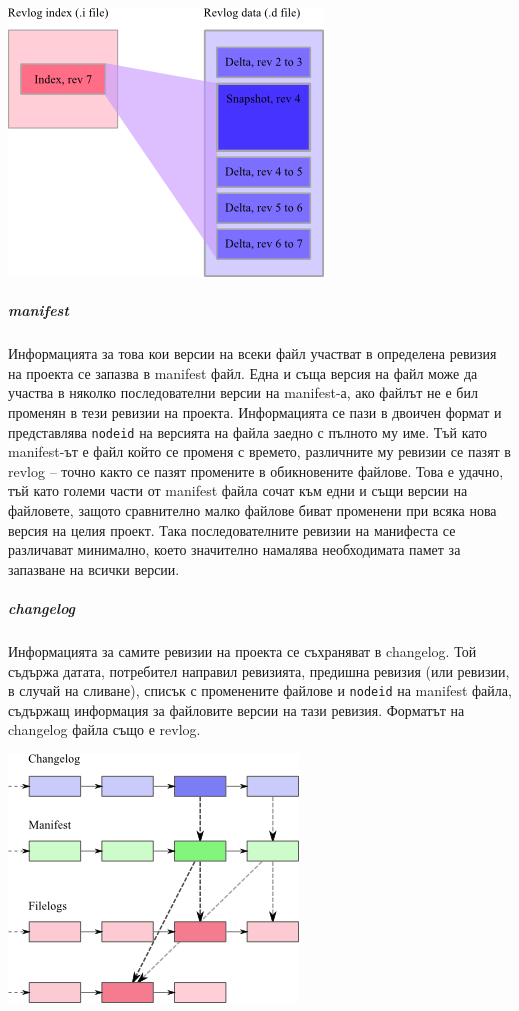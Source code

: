 \documentclass[a4paper]{article}
\begin{document}
    \begin{center}
      \includegraphics[scale=0.7]{hg_revlog}
    \end{center}

    \subparagraph{manifest} Информацията за това кои версии на всеки файл
    участват в определена ревизия на проекта се запазва в manifest файл.
    Една и съща версия на файл може да участва в няколко последователни версии
    на manifest-а, ако файлът не е бил променян в тези ревизии на проекта.
    Информацията се пази в двоичен формат и представлява \texttt{nodeid} на
    версията на файла заедно с пълното му име. Тъй като manifest-ът е файл
    който се променя с времето, различните му ревизии се пазят в revlog --
    точно както се пазят промените в обикновените файлове. Това е удачно, тъй
    като големи части от manifest файла сочат към едни и същи версии на
    файловете, защото сравнително малко файлове биват променени при всяка нова
    версия на целия проект. Така последователните ревизии на манифеста се
    различават минимално, което значително намалява необходимата памет за
    запазване на всички версии.

    \subparagraph{changelog}
    Информацията за самите ревизии на проекта се съхраняват в changelog.
    Той съдържа датата, потребител направил ревизията, предишна
    ревизия (или ревизии, в случай на сливане), списък с променените файлове
    и \texttt{nodeid} на manifest файла, съдържащ информация за файловите
    версии на тази ревизия. Форматът на changelog файла също е revlog.

    \vspace{10 mm}

    \begin{center}
      \includegraphics[scale=1.0]{hg_basics}
    \end{center}
\end{document}
